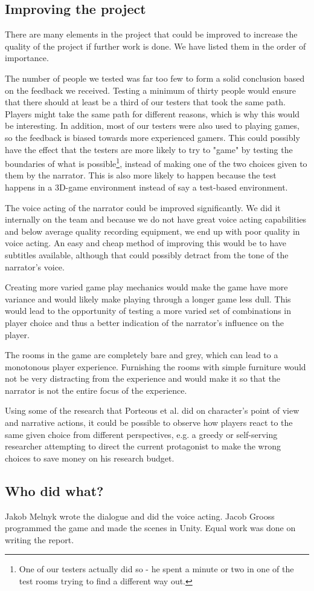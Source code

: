 \subsection{Improving the project}
There are many elements in the project that could be improved to increase the quality of the project if further work is done. We have listed them in the order of importance.

The number of people we tested was far too few to form a solid conclusion based on the feedback we received. Testing a minimum of thirty people would ensure that there should at least be a third of our testers that took the same path. Players might take the same path for different reasons, which is why this would be interesting. In addition, most of our testers were also used to playing games, so the feedback is biased towards more experienced gamers. This could possibly have the effect that the testers are more likely to try to "game" by testing the boundaries of what is possible\footnote{One of our testers actually did so - he spent a minute or two in one of the test rooms trying to find a different way out.}, instead of making one of the two choices given to them by the narrator. This is also more likely to happen because the test happens in a 3D-game environment instead of say a test-based environment.

The voice acting of the narrator could be improved significantly. We did it internally on the team and because we do not have great voice acting capabilities and below average quality recording equipment, we end up with poor quality in voice acting. An easy and cheap method of improving this would be to have subtitles available, although that could possibly detract from the tone of the narrator's voice.

Creating more varied game play mechanics would make the game have more variance and would likely make playing through a longer game less dull. This would lead to the opportunity of testing a more varied set of combinations in player choice and thus a better indication of the narrator's influence on the player.

The rooms in the game are completely bare and grey, which can lead to a monotonous player experience. Furnishing the rooms with simple furniture would not be very distracting from the experience and would make it so that the narrator is not the entire focus of the experience.

Using some of the research that Porteous et al. \cite{Por} did on character's point of view and narrative actions, it could be possible to observe how players react to the same given choice from different perspectives, e.g. a greedy or self-serving researcher attempting to direct the current protagonist to make the wrong choices to save money on his research budget.

\subsection{Who did what?}
Jakob Melnyk wrote the dialogue and did the voice acting. Jacob Grooss programmed the game and made the scenes in Unity. Equal work was done on writing the report.